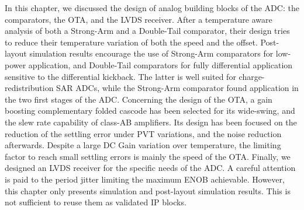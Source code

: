 In this chapter, we discussed the design of analog building blocks of the ADC\@: the comparators, the OTA, and the LVDS receiver. After a temperature aware analysis of both a Strong-Arm and a Double-Tail comparator, their design tries to reduce their temperature variation of both the speed and the offset. Post-layout simulation results encourage the use of Strong-Arm comparators for low-power application, and Double-Tail comparators for fully differential application sensitive to the differential kickback. The latter is well suited for charge-redistribution SAR ADCs, while the Strong-Arm comparator found application in the two first stages of the ADC\@.
Concerning the design of the OTA, a gain boosting complementary folded cascode has been selected for its wide-swing, and the slew rate capability of class-AB amplifiers. Its design has been focused on the reduction of the settling error under PVT variations, and the noise reduction afterwards. Despite a large DC Gain variation over temperature, the limiting factor to reach small settling errors is mainly the speed of the OTA\@.
Finally, we designed an LVDS receiver for the specific needs of the ADC\@. A careful attention is paid to the period jitter limiting the maximum ENOB achievable.
However, this chapter only presents simulation and post-layout simulation results. This is not sufficient to reuse them as validated IP blocks. 
